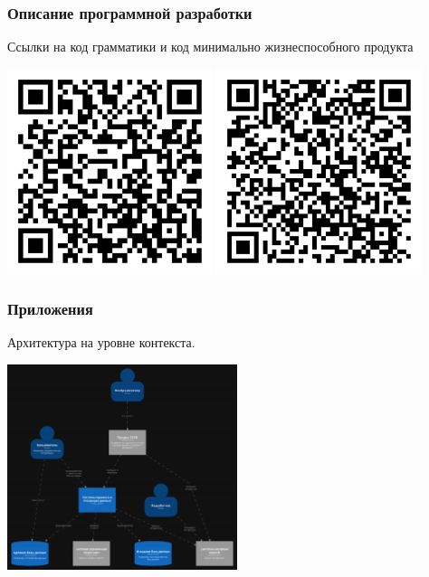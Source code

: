 \documentclass[pdf, hyperref={unicode}, aspectratio=169]{beamer}
\begin{document}
\begin{frame}
\frametitle{Описание программной разработки}
	Ссылки на код грамматики и код минимально жизнеспособного продукта

	\begin{center}
		\includegraphics[height = 6cm]{img/qr-code-relatio-lang}
		\includegraphics[height = 6cm]{img/qr-code-mvp}
	\end{center}
\end{frame}


\begin{frame}
\frametitle{Приложения}
	Архитектура на уровне контекста.

	\begin{center}
		\includegraphics[height = 6cm]{img/structurizr-SystemLandscape}
	\end{center}
\end{frame}
\end{document}
